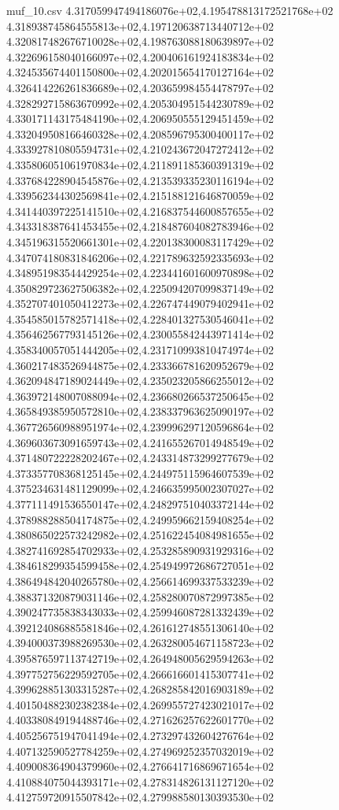 \begin{filecontents*}{muf_10.csv}
4.317059947494186076e+02,4.195478813172521768e+02
4.318938745864555813e+02,4.197120638713440712e+02
4.320817482676710028e+02,4.198763088180639897e+02
4.322696158040166097e+02,4.200406161924183834e+02
4.324535674401150800e+02,4.202015654170127164e+02
4.326414226261836689e+02,4.203659984554478797e+02
4.328292715863670992e+02,4.205304951544230789e+02
4.330171143175484190e+02,4.206950555129451459e+02
4.332049508166460328e+02,4.208596795300400117e+02
4.333927810805594731e+02,4.210243672047272412e+02
4.335806051061970834e+02,4.211891185360391319e+02
4.337684228904545876e+02,4.213539335230116194e+02
4.339562344302569841e+02,4.215188121646870059e+02
4.341440397225141510e+02,4.216837544600857655e+02
4.343318387641453455e+02,4.218487604082783946e+02
4.345196315520661301e+02,4.220138300083117429e+02
4.347074180831846206e+02,4.221789632592335693e+02
4.348951983544429254e+02,4.223441601600970898e+02
4.350829723627506382e+02,4.225094207099837149e+02
4.352707401050412273e+02,4.226747449079402941e+02
4.354585015782571418e+02,4.228401327530546041e+02
4.356462567793145126e+02,4.230055842443971414e+02
4.358340057051444205e+02,4.231710993810474974e+02
4.360217483526944875e+02,4.233366781620952679e+02
4.362094847189024449e+02,4.235023205866255012e+02
4.363972148007088094e+02,4.236680266537250645e+02
4.365849385950572810e+02,4.238337963625090197e+02
4.367726560988951974e+02,4.239996297120596864e+02
4.369603673091659743e+02,4.241655267014948549e+02
4.371480722228202467e+02,4.243314873299277679e+02
4.373357708368125145e+02,4.244975115964607539e+02
4.375234631481129099e+02,4.246635995002307027e+02
4.377111491536550147e+02,4.248297510403372144e+02
4.378988288504174875e+02,4.249959662159408254e+02
4.380865022573242982e+02,4.251622454084981655e+02
4.382741692854702933e+02,4.253285890931929316e+02
4.384618299354599458e+02,4.254949972686727051e+02
4.386494842040265780e+02,4.256614699337533239e+02
4.388371320879031146e+02,4.258280070872997385e+02
4.390247735838343033e+02,4.259946087281332439e+02
4.392124086885581846e+02,4.261612748551306140e+02
4.394000373988269530e+02,4.263280054671158723e+02
4.395876597113742719e+02,4.264948005629594263e+02
4.397752756229592705e+02,4.266616601415307741e+02
4.399628851303315287e+02,4.268285842016903189e+02
4.401504882302382384e+02,4.269955727423021017e+02
4.403380849194488746e+02,4.271626257622601770e+02
4.405256751947041494e+02,4.273297432604276764e+02
4.407132590527784259e+02,4.274969252357032019e+02
4.409008364904379960e+02,4.276641716869671654e+02
4.410884075044393171e+02,4.278314826131127120e+02
4.412759720915507842e+02,4.279988580130393530e+02

\end{filecontents*}
